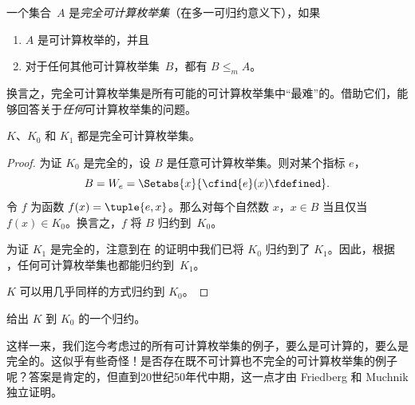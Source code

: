 \documentclass[../../../include/open-logic-section]{subfiles}
\begin{document}

\begin{defn}
一个集合~$A$ 是\emph{完全可计算枚举集}（在多一可归约意义下），如果
\begin{enumerate}
\item $A$ 是可计算枚举的，并且
\item 对于任何其他可计算枚举集~$B$，都有 $B \leq_m A$。
\end{enumerate}
\end{defn}

换言之，完全可计算枚举集是所有可能的可计算枚举集中“最难”的。借助它们，能够回答关于\emph{任何}可计算枚举集的问题。

\begin{thm}
$K$、$K_0$ 和 $K_1$ 都是完全可计算枚举集。
\end{thm}

\begin{proof}
为证 $K_0$ 是完全的，设 $B$ 是任意可计算枚举集。则对某个指标 $e$，\[
B = W_e = \Setabs{x}{\cfind{e}(x) \fdefined}.
\]
令 $f$ 为函数 $f(x) = \tuple{e, x}$。那么对每个自然数 $x$，$x \in B$ 当且仅当 $f(x) \in K_0$。换言之，$f$ 将 $B$ 归约到~$K_0$。

为证 $K_1$ 是完全的，注意到在  的证明中我们已将 $K_0$ 归约到了 $K_1$。因此，根据 ，任何可计算枚举集也都能归约到~$K_1$。

$K$ 可以用几乎同样的方式归约到 $K_0$。
\end{proof}

\begin{prob}
给出 $K$ 到 $K_0$ 的一个归约。
\end{prob}

\begin{digress}
这样一来，我们迄今考虑过的所有可计算枚举集的例子，要么是可计算的，要么是完全的。这似乎有些奇怪！是否存在既不可计算也不完全的可计算枚举集的例子呢？答案是肯定的，但直到20世纪50年代中期，这一点才由 Friedberg 和 Muchnik 独立证明。
\end{digress}
\end{document}

